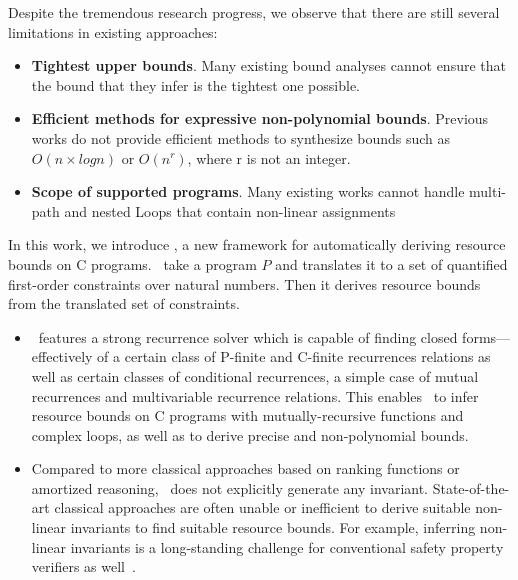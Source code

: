 Despite the tremendous research progress,  we observe that there are still several limitations in existing approaches:
\begin{itemize}
	\item \textbf{Tightest upper bounds}.  Many existing bound analyses cannot ensure that the bound that they infer is the tightest one possible.
	\item \textbf{Efficient methods for expressive non-polynomial bounds}. Previous works do not provide efficient methods to synthesize bounds such as $O(n \times log n)$ or $O(n^r)$, where r is not an integer.
	\item  \textbf{Scope of supported programs}. Many existing works cannot handle multi-path and nested Loops that contain non-linear assignments
\end{itemize}

In this work, we introduce \SystemName, a new framework for automatically deriving resource bounds on C programs. 
\SystemName\ take a program $P$ and translates it to a set of  quantified first-order constraints over natural numbers. 
Then it derives resource bounds from the translated set of constraints.

\begin{itemize}
	\item \SystemName\ features a strong recurrence solver which is capable of finding closed forms—effectively of a certain class of P-finite and C-finite recurrences relations as well as certain classes of conditional
	recurrences, a simple case of mutual recurrences and multivariable recurrence relations.  
	This enables 
	\SystemName\ to infer resource bounds on C programs with mutually-recursive functions and  complex loops, as well as to derive precise and non-polynomial bounds.
	\item Compared to more classical approaches based on ranking functions or amortized reasoning, \SystemName\ does not explicitly generate any invariant.
	State-of-the-art classical approaches are often unable or inefficient to derive suitable non-linear invariants to find suitable resource bounds. 
	For example, inferring non-linear invariants is a long-standing challenge for conventional safety property verifiers as well~\cite{ball2001automatic,mcmillan2006lazy}. 
\end{itemize}

